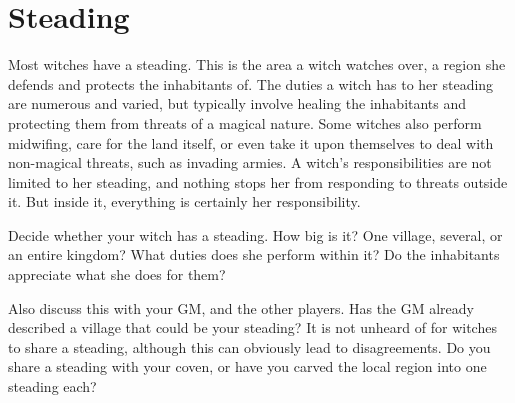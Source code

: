 \section{Steading}

Most witches have a steading.
This is the area a witch watches over, a region she defends and protects the inhabitants of.
The duties a witch has to her steading are numerous and varied, but typically involve healing the inhabitants and protecting them from threats of a magical nature.
Some witches also perform midwifing, care for the land itself, or even take it upon themselves to deal with non-magical threats, such as invading armies.
A witch's responsibilities are not limited to her steading, and nothing stops her from responding to threats outside it.
But inside it, everything is certainly her responsibility.

Decide whether your witch has a steading.
How big is it?
One village, several, or an entire kingdom?
What duties does she perform within it?
Do the inhabitants appreciate what she does for them?

Also discuss this with your GM, and the other players.
Has the GM already described a village that could be your steading?
It is not unheard of for witches to share a steading, although this can obviously lead to disagreements.
Do you share a steading with your coven, or have you carved the local region into one steading each?
